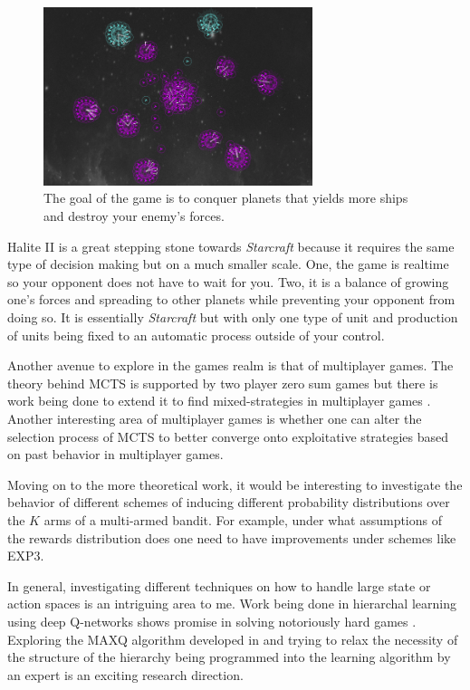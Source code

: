 \documentclass{article}
\begin{document}
  \begin{figure}[H]
    \centering
      \includegraphics[width=0.7\textwidth]{halite}
    \caption[A game of Halite II in progress]{The goal of the game is to conquer planets that yields more ships and destroy your enemy's forces.}
  \end{figure}

  Halite II is a great stepping stone towards \textit{Starcraft} because it requires the same type of decision making but on a much smaller scale. One, the game is realtime so your opponent does not have to wait for you. Two, it is a balance of growing one's forces and spreading to other planets while preventing your opponent from doing so. It is essentially \textit{Starcraft} but with only one type of unit and production of units being fixed to an automatic process outside of your control.

  Another avenue to explore in the games realm is that of multiplayer games. The theory behind MCTS is supported by two player zero sum games but there is work being done to extend it to find mixed-strategies in multiplayer games \cite{sturtevant_analysis_2008}. Another interesting area of multiplayer games is whether one can alter the selection process of MCTS to better converge onto exploitative strategies based on past behavior in multiplayer games.

  Moving on to the more theoretical work, it would be interesting to investigate the behavior of different schemes of inducing different probability distributions over the $K$ arms of a multi-armed bandit. For example, under what assumptions of the rewards distribution does one need to have improvements under schemes like EXP3.

  In general, investigating different techniques on how to handle large state or action spaces is an intriguing area to me. Work being done in hierarchal learning using deep Q-networks shows promise in solving notoriously hard games \cite{kulkarni_hierarchical_2016}. Exploring the MAXQ algorithm developed in \cite{dietterich_hierarchical_1999} and trying to relax the necessity of the structure of the hierarchy being programmed into the learning algorithm by an expert is an exciting research direction.
\end{document}
